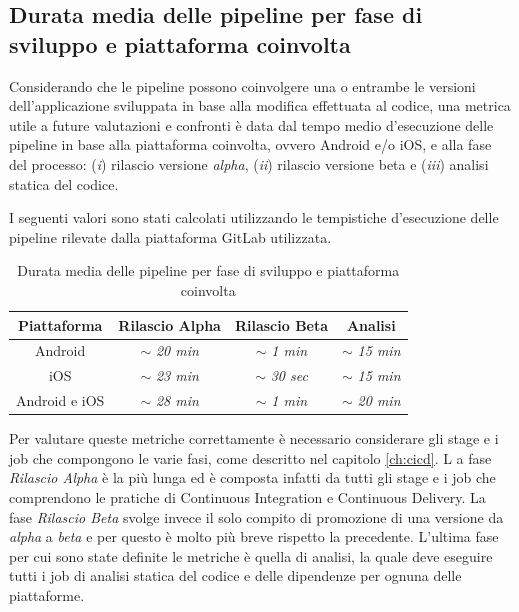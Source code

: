 \subsection*{Durata media delle pipeline per fase di sviluppo e piattaforma coinvolta}
Considerando che le pipeline possono coinvolgere una o entrambe le versioni dell'applicazione sviluppata in base alla modifica effettuata al codice, 
una metrica utile a future valutazioni e confronti è data dal tempo medio d'esecuzione delle pipeline in base alla piattaforma coinvolta, 
ovvero Android e/o iOS, 
e alla fase del processo: 
(\textit{i}) rilascio versione \textit{alpha}, 
(\textit{ii}) rilascio versione beta e (\textit{iii}) analisi statica del codice.

I seguenti valori sono stati calcolati utilizzando le tempistiche d'esecuzione delle pipeline rilevate dalla piattaforma GitLab utilizzata.

\begin{table}[H]
\centering
    \begin{tabular}{|c|c|c|c|}
         \hline
         \textbf{Piattaforma} & \textbf{Rilascio Alpha} & \textbf{Rilascio Beta} & \textbf{Analisi}\\
         \hline
         Android & $\sim$ \textit{20 min} & $\sim$ \textit{1 min} & $\sim$ \textit{15 min} \\
         \hline
         iOS & $\sim$ \textit{23 min} & $\sim$ \textit{30 sec} & $\sim$ \textit{15 min} \\
         \hline
         Android e iOS & $\sim$ \textit{28 min} & $\sim$ \textit{1 min} & $\sim$ \textit{20 min} \\
         \hline
    \end{tabular}
    \caption{Durata media delle pipeline per fase di sviluppo e piattaforma coinvolta}
\end{table}

Per valutare queste metriche correttamente è necessario considerare gli stage e i job che compongono le varie fasi, 
come descritto nel capitolo \ref{ch:cicd}. L
a fase \textit{Rilascio Alpha} è la più lunga ed è composta infatti da tutti gli stage e i job che comprendono le pratiche di Continuous Integration e Continuous Delivery. 
La fase \textit{Rilascio Beta} svolge invece il solo compito di promozione di una versione da \textit{alpha} a \textit{beta} e per questo è molto più breve rispetto la precedente. 
L'ultima fase per cui sono state definite le metriche è quella di analisi, 
la quale deve eseguire tutti i job di analisi statica del codice e delle dipendenze per ognuna delle piattaforme.

